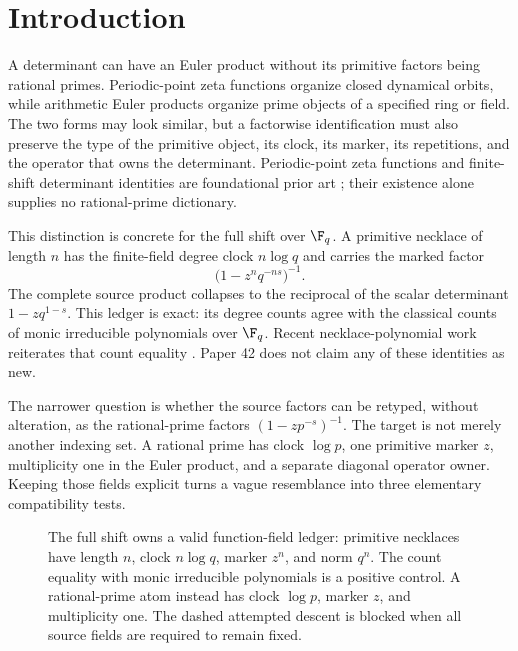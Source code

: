 \section{Introduction}
\label{sec:introduction}

A determinant can have an Euler product without its primitive factors being
rational primes. Periodic-point zeta functions organize closed dynamical
orbits, while arithmetic Euler products organize prime objects of a specified
ring or field. The two forms may look similar, but a factorwise
identification must also preserve the type of the primitive object, its
clock, its marker, its repetitions, and the operator that owns the
determinant. Periodic-point zeta functions and finite-shift determinant
identities are foundational prior art \citep{artin1965periodic,bowen1970zeta};
their existence alone supplies no rational-prime dictionary.

This distinction is concrete for the full shift over $\F_q$. A primitive
necklace of length $n$ has the finite-field degree clock $n\log q$ and carries
the marked factor
\[
  \bigl(1-z^n q^{-ns}\bigr)^{-1}.
\]
The complete source product collapses to the reciprocal of the scalar
determinant $1-zq^{1-s}$. This ledger is exact: its degree counts agree with
the classical counts of monic irreducible polynomials over $\F_q$. Recent
necklace-polynomial work reiterates that count equality
\citep{chebolu2026necklace}. Paper 42 does not claim any of these identities
as new.

The narrower question is whether the source factors can be retyped, without
alteration, as the rational-prime factors $(1-zp^{-s})^{-1}$. The target is
not merely another indexing set. A rational prime has clock $\log p$, one
primitive marker $z$, multiplicity one in the Euler product, and a separate
diagonal operator owner. Keeping those fields explicit turns a vague
resemblance into three elementary compatibility tests.

\begin{figure}[t]
  \centering
  \resizebox{\textwidth}{!}{}
  \caption{The full shift owns a valid function-field ledger: primitive
  necklaces have length $n$, clock $n\log q$, marker $z^n$, and norm $q^n$.
  The count equality with monic irreducible polynomials is a positive control.
  A rational-prime atom instead has clock $\log p$, marker $z$, and
  multiplicity one. The dashed attempted descent is blocked when all source
  fields are required to remain fixed.}
  \label{fig:source-target-types}
\end{figure}

